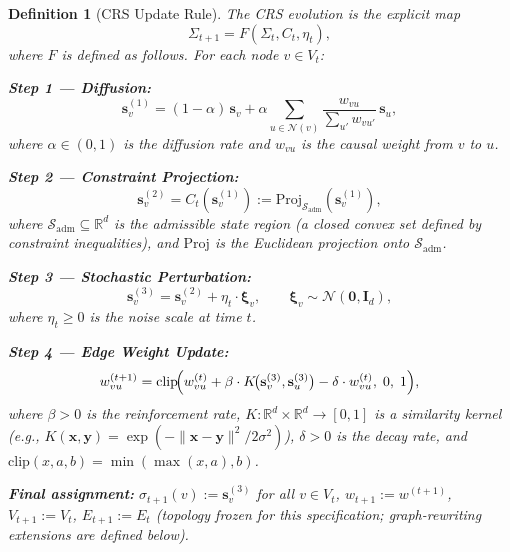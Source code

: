 \documentclass[11pt,a4paper]{article}
\newtheorem{definition}{Definition}[section]
\theoremstyle{remark}
\begin{document}
\begin{definition}[CRS Update Rule]
\label{def:crs_update}
The CRS evolution is the explicit map
\begin{equation}
\label{eq:crs_update}
  \boxed{
    \Sigma_{t+1} = F(\Sigma_t, C_t, \eta_t),
  }
\end{equation}
where $F$ is defined as follows.  For each node $v \in V_t$:

\textbf{Step 1 --- Diffusion:}
\begin{equation}
\label{eq:diffusion}
  \mathbf{s}_v^{(1)} =
    (1 - \alpha)\,\mathbf{s}_v
    + \alpha \sum_{u \in \mathcal{N}(v)}
      \frac{w_{vu}}{\sum_{u'} w_{vu'}} \, \mathbf{s}_u,
\end{equation}
where $\alpha \in (0,1)$ is the diffusion rate and $w_{vu}$ is the
causal weight from $v$ to $u$.

\textbf{Step 2 --- Constraint Projection:}
\begin{equation}
\label{eq:constraint}
  \mathbf{s}_v^{(2)} =
    C_t(\mathbf{s}_v^{(1)})
    :=
    \mathrm{Proj}_{\mathcal{S}_{\mathrm{adm}}}(\mathbf{s}_v^{(1)}),
\end{equation}
where $\mathcal{S}_{\mathrm{adm}} \subseteq \mathbb{R}^d$ is the
\emph{admissible state region} (a closed convex set defined by
constraint inequalities), and $\mathrm{Proj}$ is the Euclidean
projection onto $\mathcal{S}_{\mathrm{adm}}$.

\textbf{Step 3 --- Stochastic Perturbation:}
\begin{equation}
\label{eq:noise}
  \mathbf{s}_v^{(3)} =
    \mathbf{s}_v^{(2)} + \eta_t \cdot \boldsymbol{\xi}_v,
  \qquad
  \boldsymbol{\xi}_v \sim \mathcal{N}(\mathbf{0}, \mathbf{I}_d),
\end{equation}
where $\eta_t \geq 0$ is the noise scale at time $t$.

\textbf{Step 4 --- Edge Weight Update:}
\begin{equation}
\label{eq:edge_update}
  w_{vu}^{(t+1)} =
    \mathrm{clip}\!\Bigl(
      w_{vu}^{(t)}
      + \beta \cdot K\!\bigl(\mathbf{s}_v^{(3)}, \mathbf{s}_u^{(3)}\bigr)
      - \delta \cdot w_{vu}^{(t)},
    \; 0,\; 1\Bigr),
\end{equation}
where $\beta > 0$ is the reinforcement rate,
$K: \mathbb{R}^d \times \mathbb{R}^d \to [0,1]$ is a similarity kernel
(e.g., $K(\mathbf{x}, \mathbf{y}) = \exp(-\|\mathbf{x} - \mathbf{y}\|^2 / 2\sigma^2)$),
$\delta > 0$ is the decay rate, and $\mathrm{clip}(x, a, b) =
\min(\max(x, a), b)$.

\textbf{Final assignment:}
$\sigma_{t+1}(v) := \mathbf{s}_v^{(3)}$ for all $v \in V_t$,
$w_{t+1} := w^{(t+1)}$, $V_{t+1} := V_t$, $E_{t+1} := E_t$
(topology frozen for this specification; graph-rewriting extensions
are defined below).
\end{definition}
\end{document}
